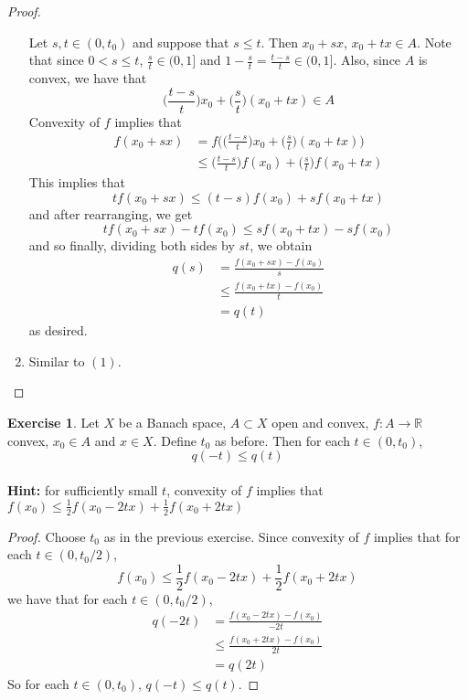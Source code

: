 \documentclass[12pt]{amsart}
\theoremstyle{definition}
\theoremstyle{remark}
\theoremstyle{definition}
\newtheorem{ex}[definition]{Exercise}
\newcommand{\R}{\mathbb{R}}
\begin{document}
	\begin{proof}
	\begin{enumerate}
	Let $s, t \in (0, t_0)$ and suppose that $s \leq t$. Then $x_0 +sx$, $x_0 + tx \in A$. Note that since $0 < s \leq t$, $\frac{s}{t} \in (0, 1]$ and $1- \frac{s}{t} = \frac{t-s}{t} \in (0, 1]$. Also, since $A$ is convex, we have that $$ \bigg( \frac{t-s}{t} \bigg) x_0 +  \bigg(\frac{s}{t} \bigg) (x_0 + tx)  \in A$$
	Convexity of $f$ implies that 
	\begin{align*}
	f(x_0 + sx)
	&= f\bigg ( \bigg( \frac{t-s}{t} \bigg) x_0 +  \bigg(\frac{s}{t} \bigg) (x_0 + tx) \bigg) \\
	& \leq \bigg( \frac{t-s}{t} \bigg) f(x_0) + \bigg(\frac{s}{t} \bigg) f(x_0 + tx)
	\end{align*}
	This implies that $$tf(x_0 + sx) \leq (t-s) f(x_0) + s f(x_0 + tx)$$
	and after rearranging, we get $$t f(x_0 + sx) - tf(x_0) \leq s f(x_0 + tx) - sf(x_0)$$
	and so finally, dividing both sides by $st$, we obtain 
	\begin{align*}
	q(s)
	&= \frac{f(x_0 + sx) - f(x_0)}{s} \\
	& \leq \frac{f(x_0 + tx) - f(x_0)}{t} \\
	&= q(t) 
	\end{align*}
	as desired.
	\item Similar to $(1)$.
	\end{enumerate}
	\end{proof}
	
	\begin{ex}
	Let $X$ be a Banach space, $A \subset X$ open and convex, $f:A \rightarrow \R$ convex, $x_0 \in A$ and $x \in X$. Define $t_0$ as before. Then for each $t \in (0, t_0)$, $$q(-t) \leq q(t)$$ \\
	\textbf{Hint:} for sufficiently small $t$, convexity of $f$ implies that $f(x_0) \leq \frac{1}{2} f(x_0 - 2tx) + \frac{1}{2} f(x_0 + 2tx)$
	\end{ex}
	
	\begin{proof}
	Choose $t_0$ as in the previous exercise. Since convexity of $f$ implies that for each $t \in (0, t_0/2)$,
	$$f(x_0) \leq \frac{1}{2} f(x_0 - 2tx) + \frac{1}{2} f(x_0 + 2tx)$$
	we have that for each $t \in (0, t_0/2)$,
	\begin{align*}
	q(-2t) 
	&= \frac{f(x_0 - 2tx) - f(x_0)}{-2t} \\
	&\leq \frac{f(x_0 + 2tx) - f(x_0)}{2t} \\
	&= q(2t)
	\end{align*}	 
	So for each $t \in (0, t_0)$, $q(-t) \leq q(t)$.
	\end{proof}	
	
\end{document}
